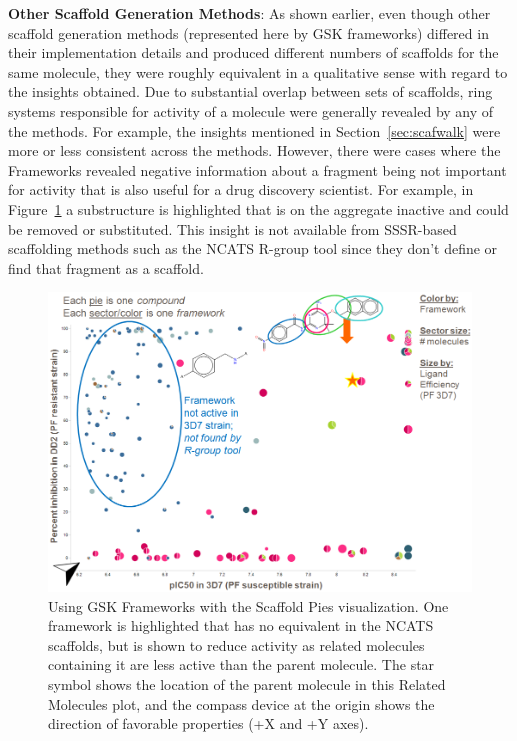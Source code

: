 \documentclass[journal=jacsat,manuscript=article]{achemso}
\newcommand*\fref[1]{Figure~\ref{fig:#1}}
\newcommand*\sref[1]{Section~\ref{sec:#1}}
\begin{document}
{\bf Other Scaffold Generation Methods}: As shown earlier, even though other scaffold generation methods (represented here by GSK frameworks) differed in their implementation details and produced different numbers of scaffolds for the same molecule, they were roughly equivalent in a qualitative sense with regard to the insights obtained. Due to substantial overlap between sets of scaffolds, ring systems responsible for activity of a molecule were generally revealed by any of the methods. For example, the insights mentioned in \sref{scafwalk} were more or less consistent across the methods. However, there were cases where the Frameworks revealed negative information about a fragment being not important for activity that is also useful for a drug discovery scientist. For example, in \fref{frameswalk} a substructure is highlighted that is on the aggregate inactive and could be removed or substituted. This insight is not available from SSSR-based scaffolding methods such as the NCATS R-group tool since they don't define or find that fragment as a scaffold.

\begin{figure}
\includegraphics[width=5in]{fig/mol1_frames_scafpie.png}
\caption{Using GSK Frameworks with the Scaffold Pies visualization. One framework is highlighted that has no equivalent in the NCATS scaffolds, but is shown to reduce activity as related molecules containing it are less active than the parent molecule.   The star symbol shows the location of the parent molecule in this Related Molecules plot, and the compass device at the origin shows the direction of favorable properties (+X and +Y axes).}      
\label{fig:frameswalk}
\end{figure}
\end{document}
